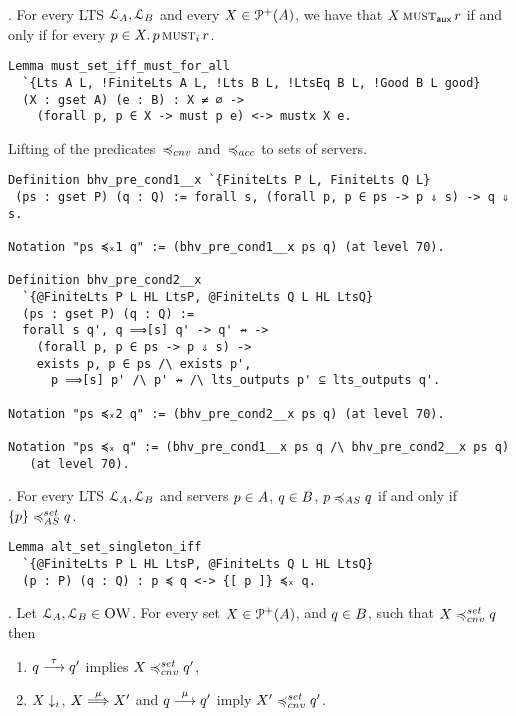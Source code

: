 .
For every LTS $\mathcal{L}_A, \mathcal{L}_B$ and every
$X \in \mathcal{P}^{+}(A)$, we have that
$X \operatorname{\textsc{must}}_{\textsf{aux}} r$ if and only if for every $p \in X
. \, p \operatorname{\textsc{must}}_i r$.

\begin{mdframed}
\begin{verbatim}
Lemma must_set_iff_must_for_all
  `{Lts A L, !FiniteLts A L, !Lts B L, !LtsEq B L, !Good B L good}
  (X : gset A) (e : B) : X ≠ ∅ ->
    (forall p, p ∈ X -> must p e) <-> mustx X e.
\end{verbatim}
\end{mdframed}

Lifting of the predicates~$\bhvleqone$ and~$\bhvleqtwo$ to sets of servers.

\begin{mdframed}
\begin{verbatim}
Definition bhv_pre_cond1__x `{FiniteLts P L, FiniteLts Q L}
 (ps : gset P) (q : Q) := forall s, (forall p, p ∈ ps -> p ⇓ s) -> q ⇓ s.

Notation "ps ≼ₓ1 q" := (bhv_pre_cond1__x ps q) (at level 70).

Definition bhv_pre_cond2__x
  `{@FiniteLts P L HL LtsP, @FiniteLts Q L HL LtsQ}
  (ps : gset P) (q : Q) :=
  forall s q', q ⟹[s] q' -> q' ↛ ->
    (forall p, p ∈ ps -> p ⇓ s) ->
    exists p, p ∈ ps /\ exists p',
      p ⟹[s] p' /\ p' ↛ /\ lts_outputs p' ⊆ lts_outputs q'.

Notation "ps ≼ₓ2 q" := (bhv_pre_cond2__x ps q) (at level 70).

Notation "ps ≼ₓ q" := (bhv_pre_cond1__x ps q /\ bhv_pre_cond2__x ps q)
   (at level 70).
\end{verbatim}
\end{mdframed}

.
For every LTS $\mathcal{L}_A, \mathcal{L}_B$ and servers $p \in A$,
$q \in B$,
$\serverA \asleq \serverB$ if and only if $\set{\serverA} \asleqset \serverB$.


\begin{mdframed}
\begin{verbatim}
Lemma alt_set_singleton_iff
  `{@FiniteLts P L HL LtsP, @FiniteLts Q L HL LtsQ}
  (p : P) (q : Q) : p ≼ q <-> {[ p ]} ≼ₓ q.
\end{verbatim}
\end{mdframed}

.
Let $\mathcal{L}_A, \mathcal{L}_B \in \textsc{OW}$.
For every set $X \in \mathcal{P}^{+}( A )$, and
$q \in B$, such that
$X \cnvleqset \serverB$ then
\begin{enumerate}
\item
  $q \mathrel{\overset{ \tau }\longrightarrow} q'$ implies $X \cnvleqset \serverB'$,
\item
  $X \downarrow_i$, $X \mathrel{\overset{\mu} \Longrightarrow} X'$ and $q \mathrel{\overset{\mu}\longrightarrow} q'$ imply $X' \cnvleqset \serverB'$.
\end{enumerate}

